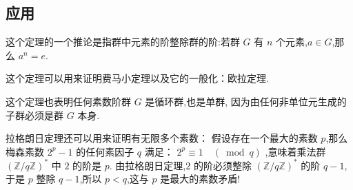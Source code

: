\documentclass[main]{subfiles}
\begin{document}
\subsection{应用}
这个定理的一个推论是指群中元素的阶整除群的阶:若群 $G$ 有 $n$ 个元素,$a\in G$,那么 $a^n=e$.

这个定理可以用来证明费马小定理以及它的一般化：欧拉定理.

这个定理也表明任何素数阶群 $G$ 是循环群,也是单群,
因为由任何非单位元生成的子群必须是群 $G$ 本身.


拉格朗日定理还可以用来证明有无限多个素数：
假设存在一个最大的素数 $p$,那么梅森素数 $2^p-1$ 的任何素因子 $q$ 满足：
$2^p \equiv 1 \quad(\bmod q)$ ,意味着乘法群 
$(\mathbb{Z} / q \mathbb{Z})^*$ 中 $2$ 的阶是 $p$. 
由拉格朗日定理,$2$ 的阶必须整除 $(\mathbb{Z} / q \mathbb{Z})^*$ 的阶 $q-1$,
于是 $p$ 整除 $q-1$,所以 $p<q$,这与 $p$ 是最大的素数矛盾!
%
\end{document}
